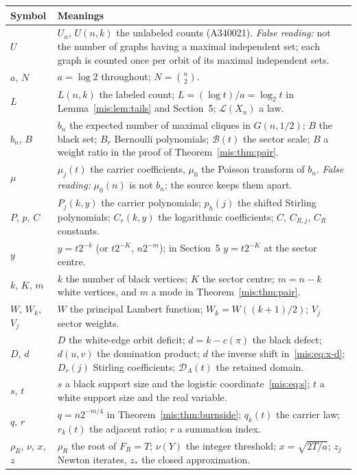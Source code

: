 \documentclass[11pt]{article}
\theoremstyle{remark}\newtheorem{remark}[theorem]{Remark}
\newcommand{\calD}{\mathcal D}
\begin{document}
\noindent\begin{tabular}{@{}>{\raggedright\arraybackslash}p{0.8in}>{\raggedright\arraybackslash}p{5.4in}@{}}
\toprule
Symbol & Meanings\\
\midrule
$U$ & $U_n$, $U(n,k)$ the unlabeled counts (A340021). \emph{False reading:} not the number of graphs having a maximal independent set; each graph is counted once per orbit of its maximal independent sets.\\
$a$, $N$ & $a=\log2$ throughout; $N=\binom n2$.\\
$L$ & $L(n,k)$ the labeled count; $L=(\log t)/a=\log_2t$ in Lemma~\ref{mis:lem:tails} and Section~5; $\mathcal L(X_n)$ a law.\\
$b_n$, $B$ & $b_n$ the expected number of maximal cliques in $G(n,1/2)$; $B$ the black set; $B_r$ Bernoulli polynomials; $\mathcal B(t)$ the sector scale; $B$ a weight ratio in the proof of Theorem~\ref{mis:thm:pair}.\\
$\mu$ & $\mu_j(t)$ the carrier coefficients, $\mu_0$ the Poisson transform of $b_n$. \emph{False reading:} $\mu_0(n)$ is not $b_n$; the source keeps them apart.\\
$P$, $p$, $C$ & $P_j(k,y)$ the carrier polynomials; $p_h(j)$ the shifted Stirling polynomials; $C_r(k,y)$ the logarithmic coefficients; $C$, $C_{R,j}$, $C_R$ constants.\\
$y$ & $y=t2^{-k}$ (or $t2^{-K}$, $n2^{-m}$); in Section~5 $y=t2^{-K}$ at the sector centre.\\
$k$, $K$, $m$ & $k$ the number of black vertices; $K$ the sector centre; $m=n-k$ white vertices, and $m$ a mode in Theorem~\ref{mis:thm:pair}.\\
$W$, $W_k$, $V_j$ & $W$ the principal Lambert function; $W_k=W((k+1)/2)$; $V_j$ sector weights.\\
$D$, $d$ & $D$ the white-edge orbit deficit; $d=k-c(\pi)$ the black defect; $d(u,v)$ the domination product; $d$ the inverse shift in~\eqref{mis:eq:x-d}; $D_r(j)$ Stirling coefficients; $\calD_A(t)$ the retained domain.\\
$s$, $t$ & $s$ a black support size and the logistic coordinate~\eqref{mis:eq:s}; $t$ a white support size and the real variable.\\
$q$, $r$ & $q=n2^{-m/4}$ in Theorem~\ref{mis:thm:burnside}; $q_k(t)$ the carrier law; $r_k(t)$ the adjacent ratio; $r$ a summation index.\\
$\rho_R$, $\nu$, $x$, $z$ & $\rho_R$ the root of $F_R=T$; $\nu(Y)$ the integer threshold; $x=\sqrt{2T/a}$; $z_j$ Newton iterates, $z_*$ the closed approximation.\\
\bottomrule
\end{tabular}
\endgroup
\end{document}
